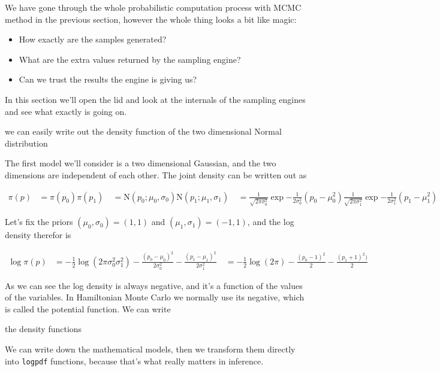 \documentclass[11pt]{article}
\begin{document}
We have gone through the whole probabilistic computation process with
MCMC method in the previous section, however the whole thing looks a bit
like magic:

\begin{itemize}
\item How exactly are the samples generated?
\item What are the extra values returned by the sampling engine?
\item Can we trust the results the engine is giving us?
\end{itemize}

In this section we'll open the lid and look at the internals of the
sampling engines and see what exactly is going on.

we can easily write out the density function of the two dimensional
Normal distribution

The first model we'll consider is a two dimensional Gaussian, and the
two dimensions are independent of each other. The joint density can be
written out as

\begin{align*} \pi(p) &= \pi(p_{0}) \pi(p_{1}) \ &= \textrm{N} (p_{0};
\mu_{0}, \sigma_{0}) \textrm{N} (p_{1}; \mu_{1}, \sigma_{1}) \ &=
\frac{1}{\sqrt{2 \pi \sigma_{0}^{2}}} \exp { - \frac{1}{2\sigma_{0}^{2}}
(p_{0} - \mu_{0}^{2}) } \frac{1}{\sqrt{2 \pi \sigma_{1}^{2}}} \exp { -
\frac{1}{2\sigma_{1}^{2}} (p_{1} - \mu_{1}^{2}) } \end{align*}

Let's fix the priors \((\mu_{0}, \sigma_{0}) = (1, 1)\) and
\((\mu_{1}, \sigma_{1}) = (-1, 1)\), and the log density therefor is

\begin{align*} \log \pi(p) &= - \frac{1}{2} \log(2 \pi \sigma_{0}^{2}
\sigma_{1}^{2} ) - \frac{(p_{0} - \mu_{0})^{2}}{2 \sigma_{0}^{2}}

- \frac{(p_{1} - \mu_{1})^{2}}{2 \sigma_{1}^{2}} \ &= - \frac{1}{2}
  \log(2 \pi ) - \frac{(p_{0} - 1)^{2}}{2} - \frac{(p_{1} + 1)^{2})}{2}
  \end{align*}

As we can see the log density is always negative, and it's a function of
the values of the variables. In Hamiltonian Monte Carlo we normally use
its negative, which is called the potential function. We can write

the density functions

We can write down the mathematical models, then we transform them
directly into \texttt{logpdf} functions, because that's what really matters in
inference.
\end{document}
